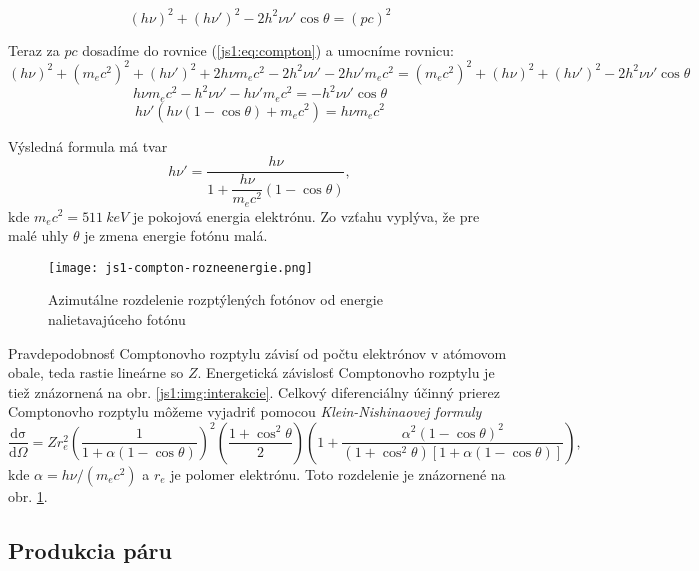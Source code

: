 \documentclass[../../main.tex]{subfiles}
\begin{document}
\begin{equation*}
(h\nu)^2+(h\nu')^2-2h^2\nu\nu'\cos\theta=(pc)^2
\end{equation*}

Teraz za $pc$ dosadíme do rovnice (\ref{js1:eq:compton}) a umocníme rovnicu:
\begin{equation*}
(h\nu)^2+(m_ec^2)^2+(h\nu')^2+2h\nu m_ec^2-2h^2\nu\nu'-2h\nu' m_ec^2=(m_ec^2)^2+(h\nu)^2+(h\nu')^2-2h^2\nu\nu'\cos\theta
\end{equation*}
\begin{equation*}
h\nu m_ec^2-h^2\nu\nu'-h\nu' m_ec^2=-h^2\nu\nu'\cos\theta
\end{equation*}
\begin{equation*}
h\nu'\left( h\nu(1-\cos\theta)+m_ec^2\right)=h\nu m_ec^2
\end{equation*}

Výsledná formula má tvar
\begin{equation}
h\nu '=\dfrac{h\nu}{1+\dfrac{h\nu}{m_ec^2}(1-\cos\theta)},
\end{equation}
kde $m_ec^2=511\:\unit{keV}$ je pokojová energia elektrónu. Zo vzťahu vyplýva, že pre malé uhly $\theta$ je zmena energie fotónu malá. 

\begin{figure}[h!]
\centering
\texttt{[image: js1-compton-rozneenergie.png]}
\caption{Azimutálne rozdelenie rozptýlených fotónov od energie nalietavajúceho fotónu}
\label{js1:img:compton-rozneenergie}
\end{figure}



Pravdepodobnosť Comptonovho rozptylu závisí od počtu elektrónov v atómovom obale, teda rastie lineárne so $Z$. Energetická závislosť Comptonovho rozptylu je tiež znázornená na obr. \ref{js1:img:interakcie}. Celkový diferenciálny účinný prierez Comptonovho rozptylu môžeme vyjadriť pomocou \textit{Klein-Nishinaovej formuly}
\begin{equation}
\dfrac{\mathrm{d\sigma}}{\mathrm{d}\Omega}=Zr_e^2\left( \dfrac{1}{1+\alpha(1-\cos\theta)}\right)^2\left(\dfrac{1+\cos^2\theta}{2}\right)\left(1+\dfrac{\alpha^2(1-\cos\theta)^2}{(1+\cos^2\theta)\left[ 1+\alpha(1-\cos\theta)\right] }\right),
\end{equation}
kde $\alpha=h\nu /(m_ec^2)$ a $r_e$ je polomer elektrónu. Toto rozdelenie je znázornené na obr. \ref{js1:img:compton-rozneenergie}.


\subsection{Produkcia páru}
\end{document}
